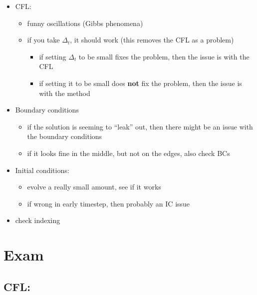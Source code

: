 \documentclass[
]{article}
\providecommand{\tightlist}{%
  \setlength{\itemsep}{0pt}\setlength{\parskip}{0pt}}
\begin{document}
\begin{itemize}
\tightlist
\item
  CFL:

  \begin{itemize}
  \tightlist
  \item
    funny oscillations (Gibbs phenomena)
  \item
    if you take \(\Delta_t\), it should work (this removes the CFL as a
    problem)

    \begin{itemize}
    \tightlist
    \item
      if setting \(\Delta_t\) to be small fixes the problem, then the
      issue is with the CFL
    \item
      if setting it to be small does \textbf{not} fix the problem, then
      the issue is with the method
    \end{itemize}
  \end{itemize}
\item
  Boundary conditions

  \begin{itemize}
  \tightlist
  \item
    if the solution is seeming to ``leak'' out, then there might be an
    issue with the boundary conditions
  \item
    if it looks fine in the middle, but not on the edges, also check BCs
  \end{itemize}
\item
  Initial conditions:

  \begin{itemize}
  \tightlist
  \item
    evolve a really small amount, see if it works
  \item
    if wrong in early timestep, then probably an IC issue
  \end{itemize}
\item
  check indexing
\end{itemize}

\hypertarget{exam}{%
\section{Exam}\label{exam}}

\hypertarget{cfl}{%
\subsection{CFL:}\label{cfl}}
\end{document}
